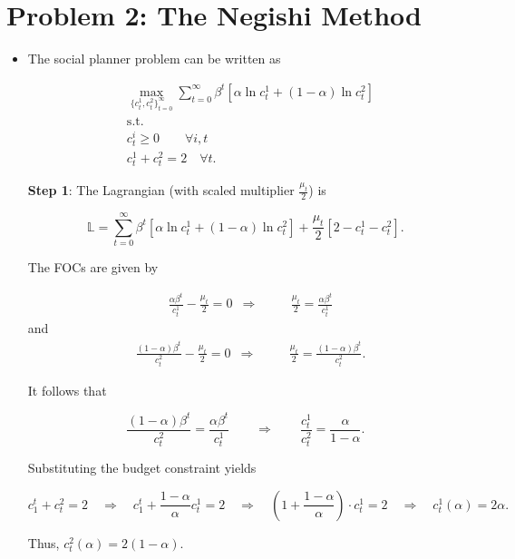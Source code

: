 \documentclass[12pt,a4paper]{article}
\begin{document}
\section*{Problem 2: The Negishi Method}

\begin{itemize}

  \item The social planner problem can be written as

    \begin{align*}
      & \max_{\{ c_t^1, c_t^2 \}^{\infty}_{t = 0}} \sum^\infty_{t=0} \beta^t [\alpha \ln c_t^1 + (1-\alpha) \ln c_t^2] \\
      & \text{s.t.} \\
      & c_t^i \geq 0 \qquad \forall i, t \\
      & c^1_t + c^2_t = 2 \quad \forall t.
    \end{align*}

    \textbf{Step 1}: The Lagrangian (with scaled multiplier $\frac{\mu_t}{2}$) is

    $$
      \mathbb{L} = \sum^\infty_{t=0} \beta^t [\alpha \ln c_t^1 + (1-\alpha) \ln c_t^2] + \frac{\mu_t}{2} [2 - c_t^1 - c_t^2].
    $$

The FOCs are given by

    \begin{align*}
      & \frac{\alpha \beta^t}{c_t^1} - \frac{\mu_t}{2} = 0 & \Rightarrow & \qquad \frac{\mu_t}{2} = \frac{\alpha \beta^t  }{c_t^1}
      \end{align*}
and
       \begin{align*}
      & \frac{(1 - \alpha) \beta^t}{c_t^2} - \frac{\mu_t}{2} = 0 & \Rightarrow & \qquad \frac{\mu_t}{2} = \frac{(1 - \alpha) \beta^t}{c_t^2}.
    \end{align*}

It follows that

    $$
    \frac{(1 - \alpha)\beta^t}{c_t^2} = \frac{\alpha \beta^t  }{c_t^1} \qquad \Rightarrow \qquad \frac{c_t^1}{c_t^2} = \frac{\alpha}{1 - \alpha}.
    $$

    Substituting the budget constraint yields

    $$
      c_1^t + c_t^2 = 2 \quad \Rightarrow \quad c_1^t + \frac{1 - \alpha}{\alpha} c_t^1 = 2 \quad \Rightarrow \quad \left(1 + \frac{1 - \alpha}{\alpha} \right) \cdot c_t^1 = 2 \quad \Rightarrow \quad c_t^1 (\alpha) = 2 \alpha.
    $$

 Thus,
 $c_t^2 (\alpha) = 2(1-\alpha)$.


\end{itemize}
\end{document}
